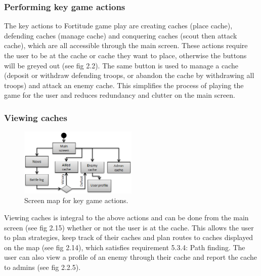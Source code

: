 \newpage
\subsubsection{Performing key game actions}

The key actions to Fortitude game play are creating caches (place cache), defending caches (manage cache) and conquering caches (scout then attack cache), which are all accessible through the main screen. These actions require the user to be at the cache or cache they want to place, otherwise the buttons will be greyed out (see fig 2.2). The same button is used to manage a cache (deposit or withdraw defending troops, or abandon the cache by withdrawing all troops) and attack an enemy cache. This simplifies the process of playing the game for the user and reduces redundancy and clutter on the main screen.

\subsubsection{Viewing caches}

\begin{figure}
	\vspace{-85pt}
	\begin{center}
	\includegraphics[width=0.5\textwidth]{images/viewing_caches}
	\caption{Screen map for key game actions.}
	\label{viewing_caches}
	\vspace{-10pt}
	\end{center}
\end{figure}

Viewing caches is integral to the above actions and can be done from the main screen (see fig 2.15) whether or not the user is at the cache. This allows the user to plan strategies, keep track of their caches and plan routes to caches displayed on the map (see fig 2.14), which satisfies requirement 5.3.4: Path finding. The user can also view a profile of an enemy through their cache and report the cache to admins (see fig 2.2.5).

